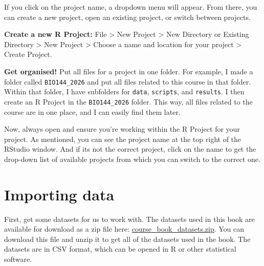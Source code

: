 \documentclass[
  letterpaper,
  8pt,
  a4paper]{book}
\begin{document}
If you click on the project name, a dropdown menu will appear. From
there, you can create a new project, open an existing project, or switch
between projects.

\textbf{Create a new R Project:} File \textgreater{} New Project
\textgreater{} New Directory or Existing Directory \textgreater{} New
Project \textgreater{} Choose a name and location for your project
\textgreater{} Create Project.

\begin{tcolorbox}[enhanced jigsaw, arc=.35mm, bottomrule=.15mm, bottomtitle=1mm, breakable, colback=white, colbacktitle=quarto-callout-important-color!10!white, colframe=quarto-callout-important-color-frame, coltitle=black, left=2mm, leftrule=.75mm, opacityback=0, opacitybacktitle=0.6, rightrule=.15mm, title=\textcolor{quarto-callout-important-color}{\faExclamation}\hspace{0.5em}{Important}, titlerule=0mm, toprule=.15mm, toptitle=1mm]

\textbf{Get organised!} Put all files for a project in one folder. For
example, I made a folder called \texttt{BIO144\_2026} and put all files
related to this course in that folder. Within that folder, I have
subfolders for \texttt{data}, \texttt{scripts}, and \texttt{results}. I
then create an R Project in the \texttt{BIO144\_2026} folder. This way,
all files related to the course are in one place, and I can easily find
them later.

\end{tcolorbox}

Now, always open and ensure you're working within the R Project for your
project. As mentioned, you can see the project name at the top right of
the RStudio window. And if its not the correct project, click on the
name to get the drop-down list of available projects from which you can
switch to the correct one.

\section*{Importing data}\label{importing-data}


First, get some datasets for us to work with. The datasets used in this
book are available for download as a zip file here:
\url{course_book_datasets.zip}. You can download this file and unzip it
to get all of the datasets used in the book. The datasets are in CSV
format, which can be opened in R or other statistical software.
\end{document}
